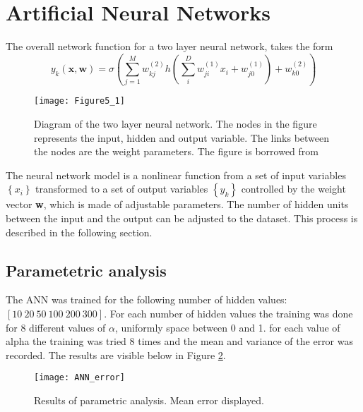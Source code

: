 \section*{Artificial Neural Networks}

The overall network function for a two layer neural network, takes the form
\begin{equation}
y_k(\mathbf{x},\mathbf{w}) = \sigma \left( \sum_{j=1}^{M} w_{kj}^{(2)} h\left( \sum_{i}^{D} w_{ji}^{(1)} x_i + w_{j0}^{(1)} \right) + w_{k0}^{(2)} \right) 
\label{eq:ANN_overall_rap}
\end{equation}


 
\begin{figure}[H]
\centering
\texttt{[image: Figure5\_1]}

\caption{Diagram of the two layer neural network. The nodes in the figure represents the input, hidden and output variable. The links between the nodes are the weight parameters. The figure is borrowed from \cite{bishop2007}} 
\label{fig:ANN_fig_theory}
\end{figure}

The neural network model is a nonlinear function from a set of input variables $ \left\lbrace x_i \right\rbrace  $ transformed to a set of output variables $ \left\lbrace y_k \right\rbrace  $ controlled by the weight vector \textbf{w}, which is made of adjustable parameters.
The number of hidden units between the input and the output can be adjusted to the dataset.
This process is described in the following section.

\subsection*{Parametetric analysis}
The ANN was trained for the following number of hidden values: $ [10\ 20\ 50\ 100\ 200\ 300] $.
For each number of hidden values the training was done for $ 8 $ different values of $ \alpha $, uniformly space between 0 and 1.
for each value of alpha the training was tried 8 times and the mean and variance of the error was recorded. The results are visible below in Figure \ref{fig:ANN_error}.

\begin{figure}[H]
\centering
\texttt{[image: ANN\_error]}
\caption{Results of parametric analysis. Mean error displayed.}
\label{fig:ANN_error}
\end{figure}

